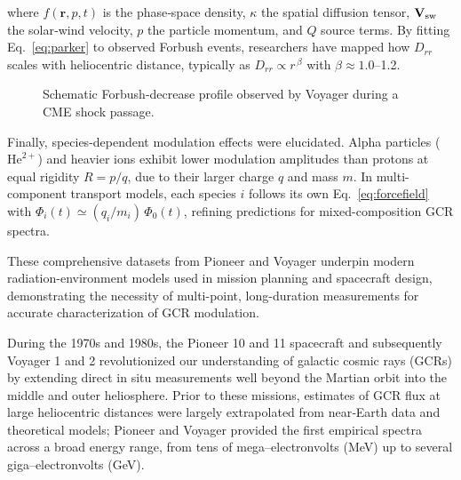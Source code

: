 \documentclass[12pt]{report}
\begin{document}
\noindent where $f(\mathbf{r},p,t)$ is the phase‐space density, $\kappa$ the spatial diffusion tensor, $\mathbf{V}_{\rm sw}$ the solar‐wind velocity, $p$ the particle momentum, and $Q$ source terms.  By fitting Eq.~\eqref{eq:parker} to observed Forbush events, researchers have mapped how $D_{rr}$ scales with heliocentric distance, typically as $D_{rr}\propto r^{\,\beta}$ with $\beta\approx1.0$–1.2.


\begin{figure}[ht]
  \centering
  \caption{Schematic Forbush‐decrease profile observed by Voyager during a CME shock passage.}
  \label{fig:forbush}
\end{figure}

Finally, species-dependent modulation effects were elucidated.  Alpha particles ($\mathrm{He}^{2+}$) and heavier ions exhibit lower modulation amplitudes than protons at equal rigidity $R=p/q$, due to their larger charge $q$ and mass $m$.  In multi-component transport models, each species $i$ follows its own Eq.~\eqref{eq:forcefield} with $\Phi_i(t)\simeq (q_i/m_i)\,\Phi_0(t)$, refining predictions for mixed-composition GCR spectra.

These comprehensive datasets from Pioneer and Voyager underpin modern radiation-environment models used in mission planning and spacecraft design, demonstrating the necessity of multi-point, long-duration measurements for accurate characterization of GCR modulation.  

During the 1970s and 1980s, the Pioneer 10 and 11 spacecraft and subsequently Voyager 1 and 2 revolutionized our understanding of galactic cosmic rays (GCRs) by extending direct in situ measurements well beyond the Martian orbit into the middle and outer heliosphere. Prior to these missions, estimates of GCR flux at large heliocentric distances were largely extrapolated from near‐Earth data and theoretical models; Pioneer and Voyager provided the first empirical spectra across a broad energy range, from tens of mega–electronvolts (MeV) up to several giga–electronvolts (GeV).
\end{document}
